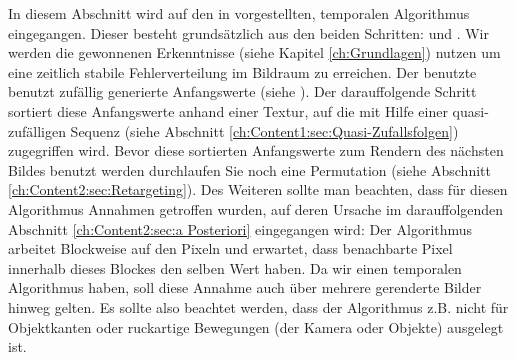 In diesem Abschnitt wird auf den in \cite{hal02158423} vorgestellten, temporalen Algorithmus eingegangen.
Dieser besteht grundsätzlich aus den beiden Schritten:  und  
. Wir werden die gewonnenen Erkenntnisse (siehe Kapitel \ref{ch:Grundlagen})
nutzen um eine zeitlich stabile  Fehlerverteilung im Bildraum zu erreichen.
Der benutzte  benutzt zufällig generierte Anfangswerte 
(siehe \cite{matsumoto1998mersenne}). Der darauffolgende Schritt sortiert diese Anfangswerte anhand 
einer  Textur, auf die mit Hilfe einer quasi-zufälligen Sequenz 
(siehe Abschnitt \ref{ch:Content1:sec:Quasi-Zufallsfolgen}) zugegriffen wird. Bevor diese sortierten Anfangswerte 
zum Rendern des nächsten Bildes benutzt werden durchlaufen Sie noch eine Permutation 
(siehe Abschnitt \ref{ch:Content2:sec:Retargeting}).
Des Weiteren sollte man beachten, dass für diesen Algorithmus Annahmen getroffen wurden, auf deren Ursache im 
darauffolgenden Abschnitt \ref{ch:Content2:sec:a Posteriori} eingegangen wird:
Der Algorithmus arbeitet Blockweise auf den Pixeln und erwartet, dass benachbarte
Pixel innerhalb dieses Blockes den selben Wert haben. Da wir einen temporalen Algorithmus haben, soll diese Annahme 
auch über mehrere gerenderte Bilder hinweg gelten. Es sollte also beachtet werden, dass der Algorithmus z.B. nicht 
für Objektkanten oder ruckartige Bewegungen (der Kamera oder Objekte) ausgelegt ist.

